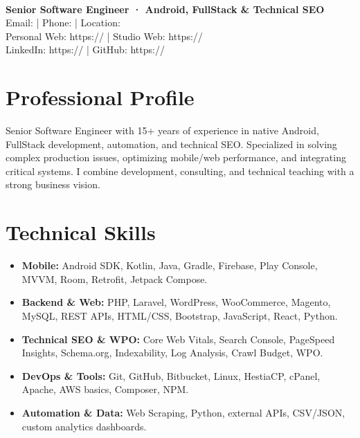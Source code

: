 \documentclass[10pt,a4paper]{article}
\begin{document}
\begin{center}
  {\Huge\bfseries \myname} \\
  \vspace{0.4em}
  {\large\bfseries Senior Software Engineer · Android, FullStack \& Technical SEO} \\
  \vspace{0.6em}
  Email: \myemail{} | Phone: \myphone{} | Location: \mylocation{} \\
  Personal Web: https://\myweb{} | Studio Web: https://\mywebwalkiria{} \\
  LinkedIn: https://\mylinkedin{} | GitHub: https://\mygithub{}
\end{center}

\vspace{0.6em}

\section{Professional Profile}
Senior Software Engineer with 15+ years of experience in native Android, FullStack development, automation, and technical SEO. Specialized in solving complex production issues, optimizing mobile/web performance, and integrating critical systems. I combine development, consulting, and technical teaching with a strong business vision.

\section{Technical Skills}
\begin{itemize}
  \item \textbf{Mobile:} Android SDK, Kotlin, Java, Gradle, Firebase, Play Console, MVVM, Room, Retrofit, Jetpack Compose.
  \item \textbf{Backend \& Web:} PHP, Laravel, WordPress, WooCommerce, Magento, MySQL, REST APIs, HTML/CSS, Bootstrap, JavaScript, React, Python.
  \item \textbf{Technical SEO \& WPO:} Core Web Vitals, Search Console, PageSpeed Insights, Schema.org, Indexability, Log Analysis, Crawl Budget, WPO.
  \item \textbf{DevOps \& Tools:} Git, GitHub, Bitbucket, Linux, HestiaCP, cPanel, Apache, AWS basics, Composer, NPM.
  \item \textbf{Automation \& Data:} Web Scraping, Python, external APIs, CSV/JSON, custom analytics dashboards.
\end{itemize}
\end{document}
